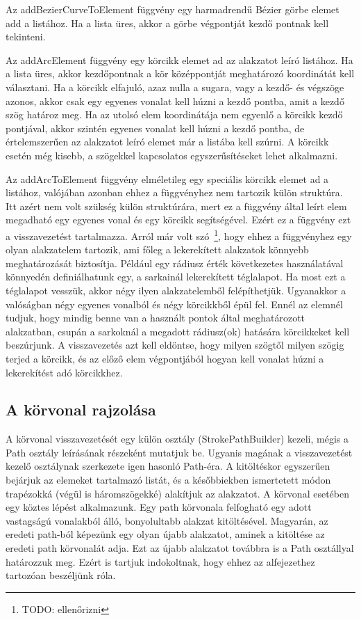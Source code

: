 \documentclass[12pt]{report}
\theoremstyle{definition}
\newcommand{\func}[1]{{\textsf{\footnotesize{#1}}}}
\begin{document}
Az \func{addBezierCurveToElement} függvény egy harmadrendű Bézier görbe elemet
add a listához. Ha a lista üres, akkor a görbe végpontját kezdő pontnak kell
tekinteni.

Az \func{addArcElement} függvény egy körcikk elemet ad az alakzatot leíró
listához. Ha a lista üres, akkor kezdőpontnak a kör középpontját meghatározó
koordinátát kell választani. Ha a körcikk elfajuló, azaz nulla a sugara, vagy a
kezdő- és végszöge azonos, akkor csak egy egyenes vonalat kell húzni a kezdő
pontba, amit a kezdő szög határoz meg. Ha az utolsó elem koordinátája nem
egyenlő a körcikk kezdő pontjával, akkor szintén egyenes vonalat kell húzni a
kezdő pontba, de értelemszerűen az alakzatot leíró elemet már a listába kell
szúrni. A körcikk esetén még kisebb, a szögekkel kapcsolatos egyszerűsítéseket
lehet alkalmazni.

Az \func{addArcToElement} függvény elméletileg egy speciális körcikk elemet ad
a listához, valójában azonban ehhez a függvényhez nem tartozik külön struktúra.
Itt azért nem volt szükség külön struktúrára, mert ez a függvény által leírt
elem megadható egy egyenes vonal és egy körcikk segítségével. Ezért ez a
függvény ezt a visszavezetést tartalmazza. Arról már volt szó~\footnote{TODO:
ellenőrizni}, hogy ehhez a függvényhez egy olyan alakzatelem tartozik, ami
főleg a lekerekített alakzatok könnyebb meghatározását biztosítja. Például egy
rádiusz érték következetes használatával könnyedén definiálhatunk egy, a
sarkainál lekerekített téglalapot. Ha most ezt a téglalapot vesszük, akkor négy
ilyen alakzatelemből felépíthetjük. Ugyanakkor a valóságban négy egyenes
vonalból és négy körcikkből épül fel. Ennél az elemnél tudjuk, hogy mindig
benne van a használt pontok által meghatározott alakzatban, csupán a sarkoknál
a megadott rádiusz(ok) hatására körcikkeket kell beszúrjunk. A visszavezetés
azt kell eldöntse, hogy milyen szögtől milyen szögig terjed a körcikk, és az
előző elem végpontjából hogyan kell vonalat húzni a lekerekítést adó
körcikkhez.

    \subsection[A körvonal rajzolása]{A körvonal rajzolása}

A körvonal visszavezetését egy külön osztály (\func{StrokePathBuilder}) kezeli,
mégis a \func{Path} osztály leírásának részeként mutatjuk be. Ugyanis magának a
visszavezetést kezelő osztálynak szerkezete igen hasonló \func{Path}-éra. A
kitöltéskor egyszerűen bejárjuk az elemeket tartalmazó listát, és a
későbbiekben ismertetett módon trapézokká (végül is háromszögekké) alakítjuk az
alakzatot. A körvonal esetében egy köztes lépést alkalmazunk. Egy path
körvonala felfogható egy adott vastagságú vonalakból álló, bonyolultabb alakzat
kitöltésével. Magyarán, az eredeti path-ból képezünk egy olyan újabb
alakzatot, aminek a kitöltése az eredeti path körvonalát adja. Ezt az újabb
alakzatot továbbra is a \func{Path} osztállyal határozzuk meg. Ezért is tartjuk
indokoltnak, hogy ehhez az alfejezethez tartozóan beszéljünk róla.
\end{document}

